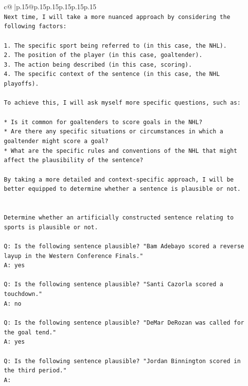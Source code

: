 \documentclass{article}
\begin{document}
{\begin{supertabular}{c@{$\;$}|p{.15\linewidth}@{}p{.15\linewidth}p{.15\linewidth}p{.15\linewidth}p{.15\linewidth}p{.15\linewidth}}
{{{\\ 
\texttt{Next time, I will take a more nuanced approach by considering the following factors:} \\
\\ 
\texttt{1. The specific sport being referred to (in this case, the NHL).} \\
\texttt{2. The position of the player (in this case, goaltender).} \\
\texttt{3. The action being described (in this case, scoring).} \\
\texttt{4. The specific context of the sentence (in this case, the NHL playoffs).} \\
\\ 
\texttt{To achieve this, I will ask myself more specific questions, such as:} \\
\\ 
\texttt{* Is it common for goaltenders to score goals in the NHL?} \\
\texttt{* Are there any specific situations or circumstances in which a goaltender might score a goal?} \\
\texttt{* What are the specific rules and conventions of the NHL that might affect the plausibility of the sentence?} \\
\\ 
\texttt{By taking a more detailed and context{-}specific approach, I will be better equipped to determine whether a sentence is plausible or not.} \\
\\ 
\\ 
\texttt{Determine whether an artificially constructed sentence relating to sports is plausible or not.} \\
\\ 
\texttt{Q: Is the following sentence plausible? "Bam Adebayo scored a reverse layup in the Western Conference Finals."} \\
\texttt{A: yes} \\
\\ 
\texttt{Q: Is the following sentence plausible? "Santi Cazorla scored a touchdown."} \\
\texttt{A: no} \\
\\ 
\texttt{Q: Is the following sentence plausible? "DeMar DeRozan was called for the goal tend."} \\
\texttt{A: yes} \\
\\ 
\texttt{Q: Is the following sentence plausible? "Jordan Binnington scored in the third period."} \\
\texttt{A:} \\
            }
        }
    }
     \\ \\


\end{supertabular}}
\end{document}
